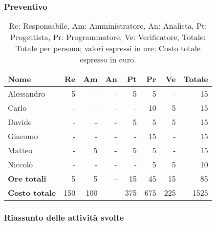 \subsubsection{Preventivo}

\begin{table}[H]
	\centering
	\begin{tabular}{l|r|r|r|r|r|r|r}
		\textbf{Nome}         & \textbf{Re} & \textbf{Am} & \textbf{An} & \textbf{Pt} & \textbf{Pr} & \textbf{Ve} & \textbf{Totale} \\
		\hline
		Alessandro            & 5           & -           & -           & 5           & 5           & -           & 15              \\
		Carlo                 & -           & -           & -           & -           & 10          & 5           & 15              \\
		Davide                & -           & -           & -           & 5           & 5           & 5           & 15              \\
		Giacomo               & -           & -           & -           & -           & 15          & -           & 15              \\
		Matteo                & -           & 5           & -           & 5           & 5           & -           & 15              \\
		Niccolò               & -           & -           & -           & -           & 5           & 5           & 10              \\
		\hline
		\textbf{Ore totali}   & 5           & 5           & -           & 15          & 45          & 15          & 85              \\
		\textbf{Costo totale} & 150         & 100         & -           & 375         & 675         & 225         & 1525
	\end{tabular}
	\caption{Re: Responsabile, Am: Amministratore, An: Analista, Pt: Progettista,
		Pr: Programmatore, Ve: Verificatore, Totale: Totale per persona; valori espressi in ore; Costo totale espresso in euro.}
\end{table}

\subsubsection{Riassunto delle attività svolte}

